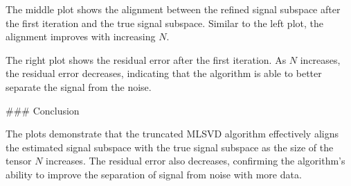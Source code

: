 The middle plot shows the alignment between the refined signal subspace after the first iteration and the true signal subspace. Similar to the left plot, the alignment improves with increasing \(N\).

The right plot shows the residual error after the first iteration. As \(N\) increases, the residual error decreases, indicating that the algorithm is able to better separate the signal from the noise.

### Conclusion

The plots demonstrate that the truncated MLSVD algorithm effectively aligns the estimated signal subspace with the true signal subspace as the size of the tensor \(N\) increases. The residual error also decreases, confirming the algorithm's ability to improve the separation of signal from noise with more data.